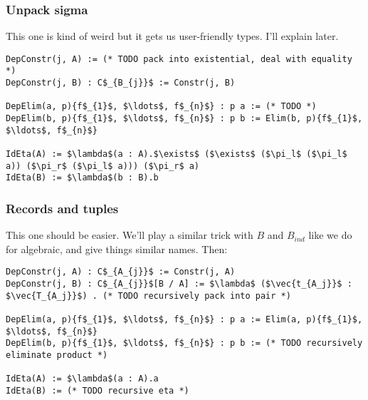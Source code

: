 
\subsubsection{Unpack sigma}

This one is kind of weird but it gets us user-friendly types. I'll explain later.

\begin{lstlisting}
DepConstr(j, A) := (* TODO pack into existential, deal with equality *)
DepConstr(j, B) : C$_{B_{j}}$ := Constr(j, B)

DepElim(a, p){f$_{1}$, $\ldots$, f$_{n}$} : p a := (* TODO *)
DepElim(b, p){f$_{1}$, $\ldots$, f$_{n}$} : p b := Elim(b, p){f$_{1}$, $\ldots$, f$_{n}$}

IdEta(A) := $\lambda$(a : A).$\exists$ ($\exists$ ($\pi_l$ ($\pi_l$ a)) ($\pi_r$ ($\pi_l$ a))) ($\pi_r$ a)
IdEta(B) := $\lambda$(b : B).b
\end{lstlisting}

\subsubsection{Records and tuples}

This one should be easier. We'll play a similar trick with $B$ and $B_{ind}$ like we do for algebraic,
and give things similar names.
Then:

\begin{lstlisting}
DepConstr(j, A) : C$_{A_{j}}$ := Constr(j, A)
DepConstr(j, B) : C$_{A_{j}}$[B / A] := $\lambda$ ($\vec{t_{A_j}}$ : $\vec{T_{A_j}}$) . (* TODO recursively pack into pair *)

DepElim(a, p){f$_{1}$, $\ldots$, f$_{n}$} : p a := Elim(a, p){f$_{1}$, $\ldots$, f$_{n}$}
DepElim(b, p){f$_{1}$, $\ldots$, f$_{n}$} : p b := (* TODO recursively eliminate product *)

IdEta(A) := $\lambda$(a : A).a
IdEta(B) := (* TODO recursive eta *)
\end{lstlisting}

